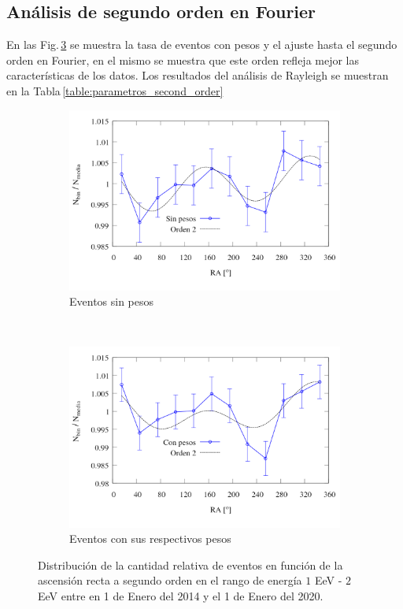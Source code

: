 \subsection{Análisis de segundo orden en Fourier}
	En las Fig.\,\ref{fig:bin_events_second_order_con} se muestra la tasa de eventos con pesos y el ajuste hasta el segundo orden en Fourier, en el mismo se muestra que este orden refleja mejor las características de los datos. Los resultados del análisis de Rayleigh  se muestran en la Tabla\,\ref{table:parametros_second_order}
        \begin{figure}[H]
          \centering
            \begin{subfigure}[b]{0.8\textwidth}
		\centering
		\includegraphics[width=\linewidth]{eventos_clasificados_por_RA_v7_orden_2_sin_pesos.png}
		\caption{Eventos sin pesos}		\label{fig:bin_events_second_order_sin}
            \end{subfigure}\\
            \begin{subfigure}[b]{0.8\textwidth}
		\centering
		\includegraphics[width=\linewidth]{eventos_clasificados_por_RA_v7_orden_2_con_pesos.png}
		\caption{ Eventos con sus respectivos pesos}		\label{fig:bin_events_second_order_con}
            \end{subfigure}
           \caption{Distribución de la cantidad relativa de eventos en función de la ascensión recta a segundo orden en el rango de energía $1$ EeV - $2$ EeV entre en 1 de Enero del 2014 y el 1 de Enero del 2020.}
         \end{figure}

